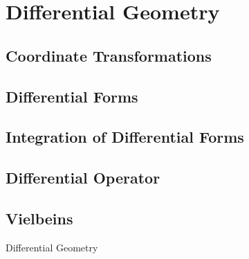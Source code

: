 \section{Differential Geometry}
\subsection{Coordinate Transformations}
\subsection{Differential Forms}
\subsection{Integration of Differential Forms}
\subsection{Differential Operator}
\subsection{Vielbeins}

Differential Geometry